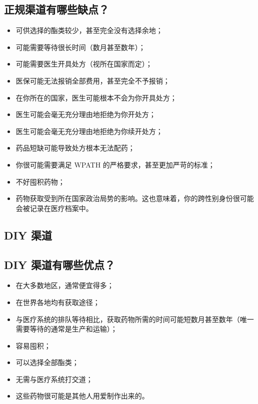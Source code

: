 \documentclass{article}
\begin{document}
\subsection{正规渠道有哪些缺点？}

\begin{itemize}
    \item 可供选择的酯类较少，甚至完全没有选择余地；
    \item 可能需要等待很长时间（数月甚至数年）；
    \item 可能需要医生开具处方（视所在国家而定）；
    \item 医保可能无法报销全部费用，甚至完全不予报销；
    \item 在你所在的国家，医生可能根本不会为你开具处方；
    \item 医生可能会毫无充分理由地拒绝为你开处方；
    \item 医生可能会毫无充分理由地拒绝为你续开处方；
    \item 药品短缺可能导致处方根本无法配药；
    \item 你很可能需要满足 WPATH 的严格要求，甚至更加严苛的标准；
    \item 不好囤积药物；
    \item 药物获取受到所在国家政治局势的影响。这也意味着，你的跨性别身份很可能会被记录在医疗档案中。
\end{itemize}

\subsection*{DIY 渠道}

\subsection{DIY 渠道有哪些优点？}

\begin{itemize}
    \item 在大多数地区，通常便宜得多；
    \item 在世界各地均有获取途径；
    \item 与医疗系统的排队等待相比，获取药物所需的时间可能短数月甚至数年（唯一需要等待的通常是生产和运输）；
    \item 容易囤积；
    \item 可以选择全部酯类；
    \item 无需与医疗系统打交道；
    \item 这些药物很可能是其他人用爱制作出来的。
\end{itemize}
\end{document}
